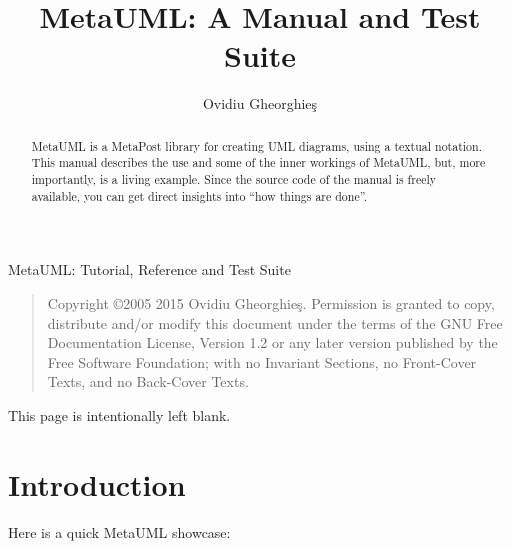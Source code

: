 \documentclass{article}
\begin{document}
MetaUML: Tutorial, Reference and Test Suite

\begin{quote}
    Copyright \copyright 2005 2015 Ovidiu Gheorghie\c{s}.
    Permission is granted to copy, distribute and/or modify this document
    under the terms of the GNU Free Documentation License, Version 1.2
    or any later version published by the Free Software Foundation;
    with no Invariant Sections, no Front-Cover Texts, and no Back-Cover Texts.
\end{quote}

\pagebreak
This page is intentionally left blank.

\pagebreak
\title{MetaUML: A Manual and Test Suite}

\author{Ovidiu Gheorghie\c{s}}

\maketitle

\begin{abstract}
MetaUML is a MetaPost library for creating UML diagrams, using a textual notation.
This manual describes the use and some of the inner workings of MetaUML, but, more importantly, is a living example.
Since the source code of the manual is freely available, you can get direct insights into ``how things are done''.
\end{abstract}

\section{Introduction}

Here is a quick MetaUML showcase:
\end{document}
